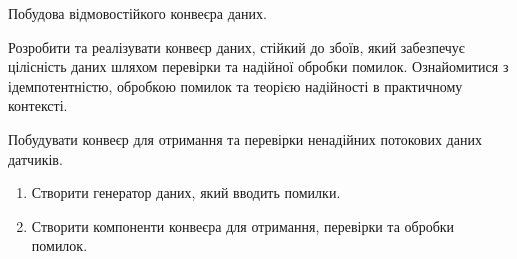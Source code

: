 


 Побудова відмовостійкого конвеєра даних.

 Розробити та реалізувати конвеєр даних, стійкий до збоїв, який забезпечує цілісність даних шляхом перевірки та надійної обробки помилок. Ознайомитися з ідемпотентністю, обробкою помилок та теорією надійності в практичному контексті.

 Побудувати конвеєр для отримання та перевірки ненадійних потокових даних датчиків.

\begin{enumerate}
  \item Створити генератор даних, який вводить помилки.
  \item Створити компоненти конвеєра для отримання, перевірки та обробки помилок.
\end{enumerate}

